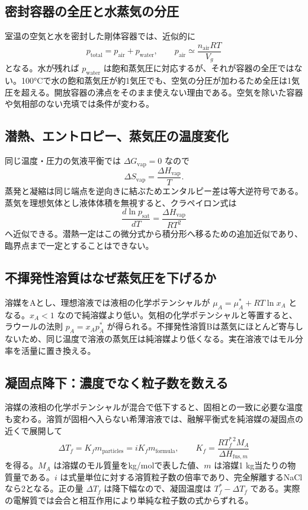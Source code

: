 \subsection{密封容器の全圧と水蒸気の分圧}
\label{theory:phase_sep:sealed}
室温の空気と水を密封した剛体容器では、近似的に
\[
 p_{\mathrm{total}}=p_{\mathrm{air}}+p_{\mathrm{water}},
 \qquad p_{\mathrm{air}}\simeq\frac{n_{\mathrm{air}}RT}{V_g}
\]
となる。水が残れば \(p_{\mathrm{water}}\) は飽和蒸気圧に対応するが、それが容器の全圧ではない。100°Cで水の飽和蒸気圧が約1気圧でも、空気の分圧が加わるため全圧は1気圧を超える。開放容器の沸点をそのまま使えない理由である。空気を除いた容器や気相部のない充填では条件が変わる。

\subsection{潜熱、エントロピー、蒸気圧の温度変化}
\label{theory:phase_sep:latent}
同じ温度・圧力の気液平衡では \(\Delta G_{\mathrm{vap}}=0\) なので
\[
 \Delta S_{\mathrm{vap}}=\frac{\Delta H_{\mathrm{vap}}}{T}.
\]
蒸発と凝縮は同じ端点を逆向きに結ぶためエンタルピー差は等大逆符号である。蒸気を理想気体とし液体体積を無視すると、クラペイロン式は
\[
 \frac{d\ln p_{\mathrm{sat}}}{dT}=\frac{\Delta H_{\mathrm{vap}}}{RT^2}
\]
へ近似できる。潜熱一定はこの微分式から積分形へ移るための追加近似であり、臨界点まで一定とすることはできない\parencite{mit_clapeyron2008}。

\subsection{不揮発性溶質はなぜ蒸気圧を下げるか}
\label{theory:phase_sep:raoult}
溶媒をAとし、理想溶液では液相の化学ポテンシャルが
\(\mu_A=\mu_A^*+RT\ln x_A\) となる。\(x_A<1\) なので純溶媒より低い。気相の化学ポテンシャルと等置すると、ラウールの法則 \(p_A=x_Ap_A^*\) が得られる。不揮発性溶質Bは蒸気にほとんど寄与しないため、同じ温度で溶液の蒸気圧は純溶媒より低くなる。実在溶液ではモル分率を活量に置き換える\parencite{mit_solutions2008}。

\subsection{凝固点降下：濃度でなく粒子数を数える}
\label{theory:phase_sep:freezing}
溶媒の液相の化学ポテンシャルが混合で低下すると、固相との一致に必要な温度も変わる。溶質が固相へ入らない希薄溶液では、融解平衡式を純溶媒の凝固点の近くで展開して
\[
 \Delta T_f=K_f m_{\mathrm{particles}}=iK_fm_{\mathrm{formula}},
 \qquad
 K_f=\frac{RT_f^{*\,2}M_A}{\Delta H_{\mathrm{fus},m}}
\]
を得る。\(M_A\) は溶媒のモル質量をkg/molで表した値、\(m\) は溶媒1 kg当たりの物質量である。\(i\) は式量単位に対する溶質粒子数の倍率であり、完全解離するNaClなら2となる。正の量 \(\Delta T_f\) は降下幅なので、凝固温度は \(T_f^*-\Delta T_f\) である。実際の電解質では会合と相互作用により単純な粒子数の式からずれる\parencite{mit_colligative2008}。

